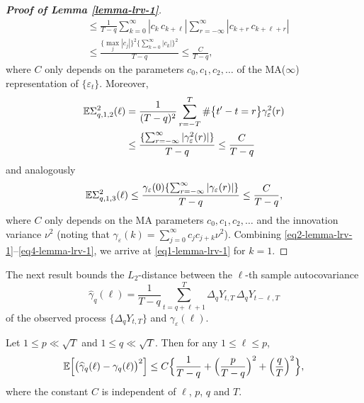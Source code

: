 \begin{proof}[\textnormal{\textbf{Proof of Lemma \ref{lemma-lrv-1}}}]
\begin{align}
 & \le \frac{1}{T-q} \sum_{k=0}^{\infty} | c_k \, c_{k+\ell} | \sum_{r=-\infty}^\infty | c_{k+r} \, c_{k+\ell+r} | \nonumber \\
 & \le \frac{\{ \max_j|c_j| \}^2 \{ \sum_{k=0}^{\infty} |c_k| \}^2}{T-q}  \le \frac{C}{T-q}, \label{eq2-lemma-lrv-1} 
\end{align}
where $C$ only depends on the parameters $c_0,c_1,c_2,\ldots$ of the MA($\infty$) representation of $\{ \varepsilon_t\}$. Moreover, 
\begin{align}
\mathbb{E} \Sigma_{q,1,2}^2(\ell) 
 & = \frac{1}{(T-q)^2} \sum_{r=-T}^T \# \big\{ t^\prime - t = r \big\} \gamma_{\varepsilon}^2(r) \nonumber \\
 & \le \frac{\{ \sum_{r=-\infty}^\infty |\gamma_{\varepsilon}^2(r)| \}}{T-q} \le \frac{C}{T-q} \label{eq3-lemma-lrv-1}
\end{align}
and analogously
\begin{equation}\label{eq4-lemma-lrv-1}
\mathbb{E} \Sigma_{q,1,3}^2(\ell) \le \frac{\gamma_{\varepsilon}(0) \{ \sum_{r=-\infty}^{\infty} |\gamma_{\varepsilon}(r)| \}}{T-q} \le \frac{C}{T-q}, 
\end{equation}
where $C$ only depends on the MA parameters $c_0,c_1,c_2,\ldots$ and the innovation variance $\nu^2$ (noting that $\gamma_\varepsilon(k) = \sum_{j=0}^\infty c_j c_{j+k} \nu^2$). Combining \eqref{eq2-lemma-lrv-1}--\eqref{eq4-lemma-lrv-1}, we arrive at \eqref{eq1-lemma-lrv-1} for $k = 1$. 
\end{proof}


The next result bounds the $L_2$-distance between the $\ell$-th sample autocovariance 
\[ \widehat{\gamma}_q(\ell) = \frac{1}{T-q} \sum_{t=q+\ell+1}^T \Delta_q Y_{t,T} \, \Delta_q Y_{t-\ell,T} \]
of the observed process $\{ \Delta_q Y_{t,T} \}$ and $\gamma_{\varepsilon}(\ell)$. 
\begin{lemmaA}\label{lemma-lrv-2}
Let $1 \le p \ll \sqrt{T}$ and $1 \le q \ll \sqrt{T}$. Then for any $1 \le \ell \le p$,   
\[ \mathbb{E} \Big[ \big( \widehat{\gamma}_q(\ell) - \gamma_q(\ell) \big)^2 \Big] \le  C \Big\{ \frac{1}{T-q} + \Big(\frac{p}{T-q}\Big)^2 + \Big(\frac{q}{T}\Big)^2 \Big\}, \]
where the constant $C$ is independent of $\ell$, $p$, $q$ and $T$. 
\end{lemmaA}


